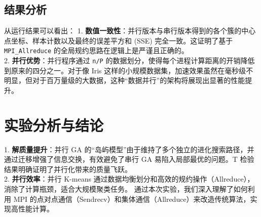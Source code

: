 \documentclass[11pt,a4paper]{article}
\begin{document}
\subsection{结果分析}
从运行结果可以看出：
1. \textbf{数值一致性}：并行版本与串行版本得到的各个簇的中心点坐标、样本计数以及最终的误差平方和 (SSE) 完全一致。这证明了基于 \texttt{MPI\_Allreduce} 的全局规约思路在逻辑上是严谨且正确的。\\
2. \textbf{并行优势}：并行程序通过 \texttt{n/P} 的数据划分，使得每个进程计算距离的开销降低到原来的四分之一。对于像 Iris 这样的小规模数据集，加速效果虽然在毫秒级不明显，但对于百万量级的大数据，这种“数据并行”的架构将展现出显著的性能提升。

\section{实验分析与结论}
1. \textbf{解质量提升}：并行 GA 的“岛屿模型”由于维持了多个独立的进化搜索路径，并通过迁移增强了信息交换，有效避免了串行 GA 易陷入局部最优的问题。T 检验结果明确证明了并行化带来的质量飞跃。\\
2. \textbf{并行效率}：并行 K-means 通过数据均衡划分和高效的规约操作（Allreduce），消除了计算瓶颈，适合大规模聚类任务。
通过本次实验，我们深入理解了如何利用 MPI 的点对点通信（Sendrecv）和集体通信（Allreduce）来改造传统算法，实现高性能计算。
\end{document}
